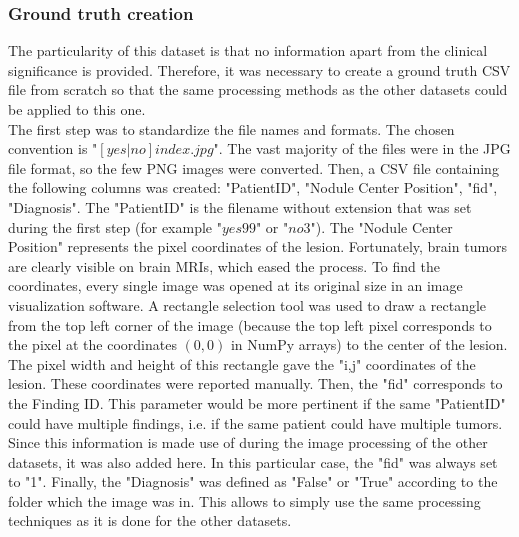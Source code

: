 \subsubsection{Ground truth creation}
\label{sec:braingroundtruth}
\setlength{\marginparwidth}{3cm}\leavevmode {}The particularity of this dataset is that no information apart from the clinical significance is provided. Therefore, it was necessary to create a ground truth CSV file from scratch so that the same processing methods as the other datasets could be applied to this one.\\
The first step was to standardize the file names and formats. The chosen convention is "$[yes|no]{index}.jpg$". The vast majority of the files were in the JPG file format, so the few PNG images were converted. Then, a CSV file containing the following columns was created: "PatientID", "Nodule Center Position", "fid", "Diagnosis". The "PatientID" is the filename without extension that was set during the first step (for example "$yes99$" or "$no3$"). The "Nodule Center Position" represents the pixel coordinates of the lesion. Fortunately, brain tumors are clearly visible on brain MRIs, which eased the process. To find the coordinates, every single image was opened at its original size in an image visualization software. A rectangle selection tool was used to draw a rectangle from the top left corner of the image (because the top left pixel corresponds to the pixel at the coordinates $(0,0)$ in NumPy arrays) to the center of the lesion. The pixel width and height of this rectangle gave the "i,j" coordinates of the lesion. These coordinates were reported manually. Then, the "fid" corresponds to the Finding ID. This parameter would be more pertinent if the same "PatientID" could have multiple findings, i.e. if the same patient could have multiple tumors. Since this information is made use of during the image processing of the other datasets, it was also added here. In this particular case, the "fid" was always set to "1". Finally, the "Diagnosis" was defined as "False" or "True" according to the folder which the image was in. This allows to simply use the same processing techniques as it is done for the other datasets.


